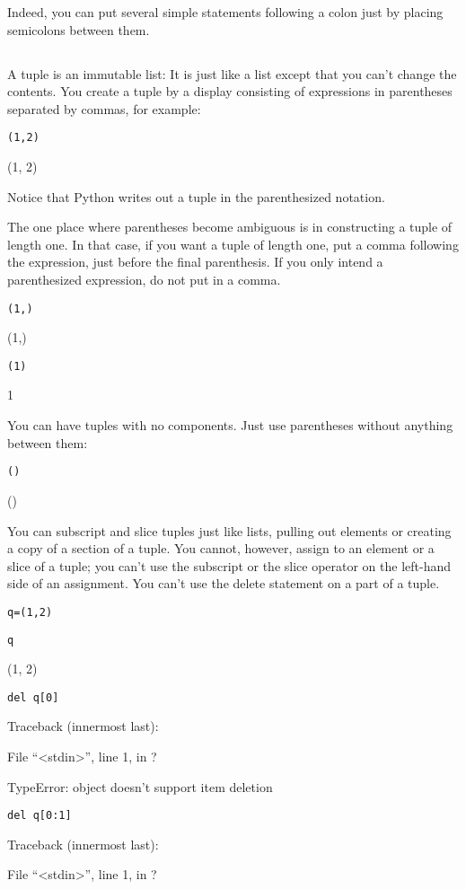 Indeed, you can put several simple
statements following a colon just by placing semicolons between them.

\subsection[Tuples]{}


A tuple is an immutable list: It is
just like a list except that you can't change the contents. You create a
tuple by a display consisting of expressions in parentheses separated by
commas, for example:


\texttt{(1,2)}

(1, 2)

Notice that Python writes out a
tuple in the parenthesized notation.

The one place where parentheses
become ambiguous is in constructing a tuple of length one. In that case,
if you want a tuple of length one, put a comma following the expression,
just before the final parenthesis. If you only intend a parenthesized
expression, do not put in a comma.


\texttt{(1,)}

(1,)


\texttt{(1)}

1

You can have tuples with no
components. Just use parentheses without anything between them:


\texttt{()}

()

You can subscript and slice tuples
just like lists, pulling out elements or creating a copy of a section of
a tuple. You cannot, however, assign to an element or a slice of a
tuple; you can't use the subscript or the slice operator on the
left-hand side of an assignment. You can't use the delete statement on a
part of a tuple.


\texttt{q=(1,2)}


\texttt{q}

(1, 2)


\texttt{del q{[}0{]}}

Traceback (innermost last):

 File
``\textless{}stdin\textgreater{}'', line 1, in ?

TypeError: object doesn't support
item deletion


\texttt{del q{[}0:1{]}}

Traceback (innermost last):

 File
``\textless{}stdin\textgreater{}'', line 1, in ?

